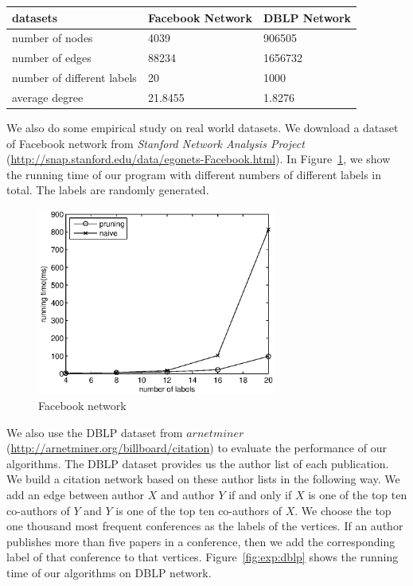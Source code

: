 \begin{table}[h]
    \centering
    \begin{tabular}{|l|l|l|}
    \hline
    datasets                   & Facebook Network & DBLP Network \\ \hline
    number of nodes            & 4039             & 906505       \\ \hline
    number of edges            & 88234            & 1656732      \\ \hline
    number of different labels & 20               & 1000         \\ \hline
    average degree             & 21.8455          & 1.8276       \\ \hline
    \end{tabular}
    \label{tab:exp:fb_dblp}
\end{table}

We also do some empirical study on real world datasets. We download a dataset of Facebook network from \emph{Stanford Network Analysis Project} (\url{http://snap.stanford.edu/data/egonets-Facebook.html}). In Figure~\ref{fig:exp:fb}, we show the running time of our program with different numbers of different labels in total. The labels are randomly generated.

\begin{figure}[h]
    \centering
      \includegraphics[width=0.7\textwidth]{figs/FB}
    \caption{Facebook network}
    \label{fig:exp:fb}
\end{figure}


We also use the DBLP dataset from $arnetminer$ (\url{http://arnetminer.org/billboard/citation}) to evaluate the performance of our algorithms. The DBLP dataset provides us the author list of each publication. We build a citation network based on these author lists in the following way. We add an edge between author $X$ and author $Y$ if and only if $X$ is one of the top ten co-authors of $Y$ and $Y$ is one of the top ten co-authors of $X$. We choose the top one thousand most frequent conferences as the labels of the vertices. If an author publishes more than five papers in a conference, then we add the corresponding label of that conference to that vertices. Figure~\ref{fig:exp:dblp} shows the running time of our algorithms on DBLP network.


